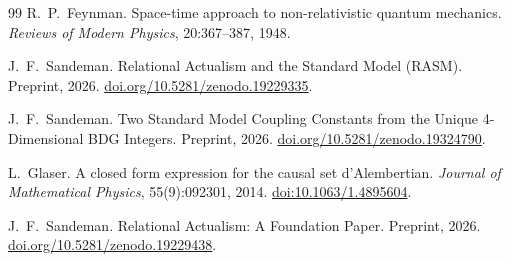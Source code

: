 \documentclass[11pt,a4paper]{article}
\theoremstyle{plain}
\theoremstyle{definition}
\theoremstyle{remark}
\begin{document}
\begin{thebibliography}{99}
R.~P.~Feynman.
\newblock Space-time approach to non-relativistic quantum mechanics.
\newblock \textit{Reviews of Modern Physics}, 20:367--387, 1948.

J.~F.~Sandeman.
\newblock Relational Actualism and the Standard Model ({RASM}).
\newblock Preprint, 2026.
\newblock \href{https://doi.org/10.5281/zenodo.19229335}{doi.org/10.5281/zenodo.19229335}.

J.~F.~Sandeman.
\newblock Two Standard Model Coupling Constants from the Unique 4-Dimensional
  BDG Integers.
\newblock Preprint, 2026.
\newblock \href{https://doi.org/10.5281/zenodo.19324790}{doi.org/10.5281/zenodo.19324790}.

L.~Glaser.
\newblock A closed form expression for the causal set d'Alembertian.
\newblock \emph{Journal of Mathematical Physics}, 55(9):092301, 2014.
\newblock \href{https://doi.org/10.1063/1.4895604}{doi:10.1063/1.4895604}.

J.~F.~Sandeman.
\newblock Relational Actualism: A Foundation Paper.
\newblock Preprint, 2026.
\newblock \href{https://doi.org/10.5281/zenodo.19229438}{doi.org/10.5281/zenodo.19229438}.

\end{thebibliography}
\end{document}
